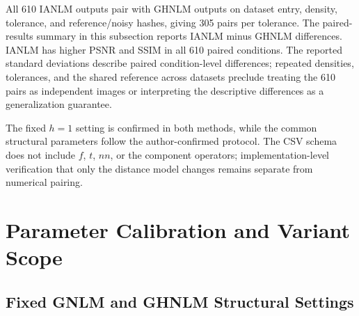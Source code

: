 \documentclass[pdflatex,iicol,sn-mathphys-num]{sn-jnl}
\newif\ifshowportuguese
\newcommand{\pt}[1]{\ifshowportuguese\par\begingroup\small\color{blue!55!black}\noindent\textbf{PT: }#1\par\endgroup\fi}
\begin{document}
All 610 IANLM outputs pair with GHNLM outputs on dataset entry, density, tolerance, and reference/noisy hashes, giving 305 pairs per tolerance. The paired-results summary in this subsection reports IANLM minus GHNLM differences. IANLM has higher PSNR and SSIM in all 610 paired conditions. The reported standard deviations describe paired condition-level differences; repeated densities, tolerances, and the shared reference across datasets preclude treating the 610 pairs as independent images or interpreting the descriptive differences as a generalization guarantee.
\pt{Todas as 610 saídas IANLM se emparelham com saídas GHNLM pela entrada do conjunto, densidade, tolerância e hashes de referência/imagem ruidosa, totalizando 305 pares por tolerância. O resumo de resultados emparelhados nesta subseção apresenta as diferenças IANLM menos GHNLM. O IANLM apresenta PSNR e SSIM maiores nas 610 condições emparelhadas. Os desvios padrão apresentados descrevem diferenças emparelhadas por condição; as densidades e tolerâncias repetidas e a referência compartilhada entre conjuntos impedem tratar os 610 pares como imagens independentes ou interpretar as diferenças descritivas como garantia de generalização.}

The fixed $h=1$ setting is confirmed in both methods, while the common structural parameters follow the author-confirmed protocol. The CSV schema does not include $f$, $t$, $nn$, or the component operators; implementation-level verification that only the distance model changes remains separate from numerical pairing.
\pt{A configuração fixa $h=1$ está confirmada nos dois métodos, enquanto os parâmetros estruturais comuns seguem o protocolo confirmado pelos autores. O esquema CSV não inclui $f$, $t$, $nn$ nem os operadores dos componentes; a verificação, no nível de implementação, de que somente o modelo de distância muda permanece separada do emparelhamento numérico.}


\section{Parameter Calibration and Variant Scope}
\label{sec:ablation}

\subsection{Fixed GNLM and GHNLM Structural Settings}
\label{subsec:gnlm_structural_sensitivity}
\end{document}
